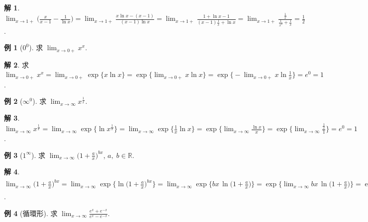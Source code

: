 \documentclass[12pt,a4paper]{extarticle}
\newcommand{\ds}{\displaystyle}
\theoremstyle{definition}
\newtheorem*{ex}{例}
\newtheorem*{sol}{解}
\begin{document}
\begin{sol}
  $\ds\lim_{x\to 1+}\Big(\frac{x}{x - 1} - \frac{1}{\ln x}\Big) = \lim_{x\to 1+}\frac{x\ln x - (x - 1)}{(x - 1)\ln x} = \lim_{x\to 1+}\frac{1 + \ln x - 1}{(x - 1)\frac{1}{x} + \ln x} = \lim_{x\to 1+}\frac{\frac{1}{x}}{\frac{1}{x^2} + \frac{1}{x}} = \frac{1}{2}$. 
\end{sol}

\begin{ex}[$0^0$]
  求 $\ds\lim_{x\to 0+} x^x$. 
\end{ex}

\begin{sol}
  求 $\ds\lim_{x\to 0+} x^x = \lim_{x\to 0+} \exp\{x\ln x\} = \exp\big\{\lim_{x\to 0+} x\ln x\big\} = \exp\Big\{-\lim_{x\to 0+} x\ln\frac{1}{x}\Big\} = e^0 = 1$. 
\end{sol}

\begin{ex}[$\infty^0$]
  求 $\ds\lim_{x\to\infty} x^{\frac{1}{x}}$.  
\end{ex}

\begin{sol}
  $\ds\lim_{x\to\infty} x^{\frac{1}{x}} = \lim_{x\to\infty}\exp\big\{\ln x^{\frac{1}{x}}\big\} = \lim_{x\to\infty}\exp\Big\{\frac{1}{x}\ln x\Big\} = \exp\Big\{\lim_{x\to\infty}\frac{\ln x}{x}\Big\} = \exp\Big\{\lim_{x\to\infty}\frac{\frac{1}{x}}{1}\Big\} = e^0 = 1$.  
\end{sol}

\begin{ex}[$1^\infty$]
  求 $\ds\lim_{x\to\infty} \Big(1 + \frac{a}{x}\Big)^{bx}$, $a,\;b\in\mathbb{R}$. 
\end{ex}

\begin{sol}
  $\ds\lim_{x\to\infty} \Big(1 + \frac{a}{x}\Big)^{bx} = \lim_{x\to\infty} \exp\Big\{\ln\big(1 + \frac{a}{x}\big)^{bx}\Big\} = \lim_{x\to\infty} \exp\Big\{bx\,\ln\big(1 + \frac{a}{x}\big)\Big\} = \exp\Big\{\lim_{x\to\infty} bx\,\ln\big(1 + \frac{a}{x}\big)\Big\} = \exp\bigg\{b\lim_{x\to\infty}\frac{\ln(1 + \frac{a}{x})}{\frac{1}{x}}\bigg\} = \exp\bigg\{b\lim_{x\to\infty}\frac{\frac{1}{1 + \frac{a}{x}}\cdot\frac{-a}{x^2}}{\frac{-1}{x^2}}\bigg\} = \exp\bigg\{b\lim_{x\to\infty}\frac{a}{1 + \frac{a}{x}}\bigg\} = e^{ba}$. 
\end{sol}

\begin{ex}[循環形]
  求 $\ds\lim_{x\to\infty}\frac{e^x + e^{-x}}{e^x - e^{-x}}$. 
\end{ex}
\end{document}
